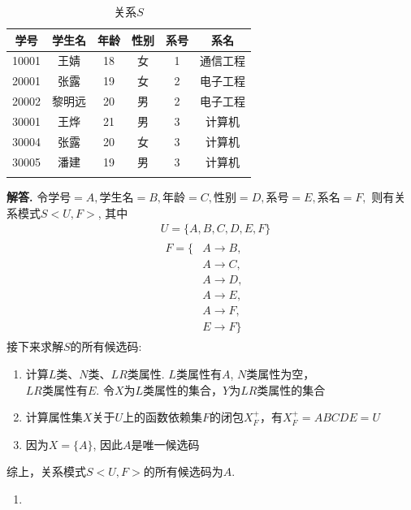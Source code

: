 \documentclass[12pt, oneside]{ctexart}
\numberwithin{figure}{section}
\numberwithin{table}{section}
\newenvironment{solution}{\par\noindent\textbf{解答. }}{\par}
\begin{document}
\begin{longtable}{|c|c|c|c|c|c|}
    \hline
    \bf 学号 & \bf 学生名 & \bf 年龄 & \bf 性别 & \bf 系号 & \bf 系名 \\
    \hline
    10001 & 王婧 & 18 & 女 & 1 & 通信工程 \\
    20001 & 张露 & 19 & 女 & 2 & 电子工程 \\
    20002 & 黎明远 & 20 & 男 & 2 & 电子工程 \\
    30001 & 王烨 & 21 & 男 & 3 & 计算机 \\
    30004 & 张露 & 20 & 女 & 3 & 计算机 \\
    30005 & 潘建 & 19 & 男 & 3 & 计算机 \\
    \hline
    \caption{关系$S$}
    \label{S}
\end{longtable}

\begin{solution}
    令$\text{学号} = A, \text{学生名} = B, \text{年龄} = C, \text{性别} = D, \text{系号} = E, \text{系名} = F,$
    则有关系模式$S<U,F>$, 其中
    $$
        \begin{aligned}
            & U = \{A, B, C, D, E, F\} \\
            & \begin{aligned}
                F = \{ &A\rightarrow B, \\
                & A\rightarrow C, \\
                & A\rightarrow D, \\
                & A\rightarrow E, \\
                & A\rightarrow F, \\
                & E\rightarrow F\}
              \end{aligned}
        \end{aligned}
    $$
    接下来求解$S$的所有候选码:
    \begin{enumerate}[$1^\circ$]
        \item 计算$L$类、$N$类、$LR$类属性. $L$类属性有$A$, $N$类属性为空，\\
        $LR$类属性有$E$. 令$X$为$L$类属性的集合，$Y$为$LR$类属性的集合
        \item 计算属性集$X$关于$U$上的函数依赖集$F$的闭包$X_F^+$，有$X_F^+ = ABCDE = U$
        \item 因为$X = \{ A \}$, 因此$A$是唯一候选码
    \end{enumerate}
    综上，关系模式$S<U, F>$的所有候选码为$A$.
    \begin{enumerate}[(1)]
        \item 

\end{enumerate}
\end{solution}
\end{document}
